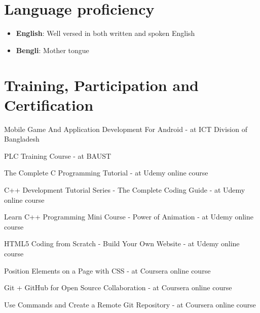 \documentclass[a4paper]{article}
\newcommand{\resumeItem}[2]{
  \item\small{
    \textbf{#1}{: #2 \vspace{-2pt}}
  }
}
\newcommand{\resumeSubItem}[2]{\resumeItem{#1}{#2}\vspace{-3pt}}
\newcommand{\resumeSubHeadingListStart}{\begin{itemize}[leftmargin=*]}
\newcommand{\resumeSubHeadingListEnd}{\end{itemize}}
\begin{document}
\section{Language proficiency}
	\resumeSubHeadingListStart
	\resumeSubItem{English\hspace{2mm}}{Well versed in both written and spoken English}
	\resumeSubItem{Bengli\hspace{3.6mm}}{Mother tongue}
\resumeSubHeadingListEnd
\vspace{1pt}





\section{Training, Participation and Certification}
\begin{description}[font=$\bullet$]
\item {Mobile Game And Application Development For Android - at ICT Division of Bangladesh}
\vspace{-5pt}
\item {PLC Training Course - at BAUST}
\vspace{-5pt}
\item {The Complete C Programming Tutorial - at Udemy online course}
\vspace{-5pt}
\item {C++ Development Tutorial Series - The Complete Coding Guide - at Udemy online course }
\vspace{-5pt}
\item {Learn C++ Programming Mini Course - Power of Animation - at Udemy online course}
\vspace{-5pt}
\item {HTML5 Coding from Scratch - Build Your Own Website - at Udemy online course}
\vspace{-5pt}
\item {Position Elements on a Page with CSS - at Coursera online course }
\vspace{-5pt}
\item {Git + GitHub for Open Source Collaboration - at Coursera online course}
\vspace{-5pt}
\item {Use Commands and Create a Remote Git Repository - at Coursera online course}
\end{description}
\vspace{1pt}
\end{document}
